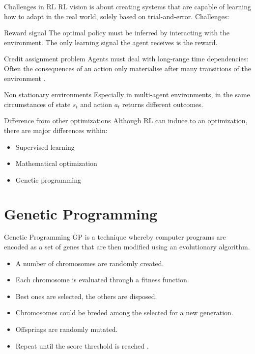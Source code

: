 \documentclass[aspectratio=169]{beamer}
\begin{document}
\begin{frame}{Challenges in RL}
	RL  vision  is about creating  systems that  are  capable  of  learning  how  to  adapt  in  the  real  world, solely based on trial-and-error.	
	Challenges:
	\begin{alertblock}{Reward signal}
	The  optimal  policy  must  be  inferred  by  interacting with the environment. The only learning signal
the agent receives is the reward.
	\end{alertblock}
	\begin{alertblock}{Credit assignment problem}
	Agents  must  deal  with  long-range  time  dependencies:
Often the consequences of an action only materialise after
many transitions of the environment \cite{Montague1999}.
	\end{alertblock}
	\begin{alertblock}{Non stationary environments}
	Especially in multi-agent environments, in the same circumstances of state $s_t$ and action $a_t$ returns different outcomes.
	\end{alertblock}

\end{frame}

\begin{frame}[fragile]{Difference from other optimizations}
Although RL can induce to an optimization, there are major differences within:
  \begin{itemize}[<+- | alert@+>]
    \item {Supervised learning}
	\item Mathematical optimization
	\item Genetic programming
  \end{itemize}
\end{frame}

\section{Genetic Programming}
\begin{frame}{Genetic Programming}
	\textsc{GP} is a technique whereby computer programs are encoded as a set of genes that are then modified using an evolutionary algorithm.
	\begin{itemize}
		\item A number of chromosomes are randomly created.
		\item Each chromosome is evaluated through a fitness function.
		\item Best ones are selected, the others are disposed.
		\item Chromosomes could be breded among the selected for a new generation.
		\item Offsprings are randomly mutated.
		\item Repeat until the score threshold is reached \cite{gf-gp}.
	\end{itemize}
\end{frame}
\end{document}
